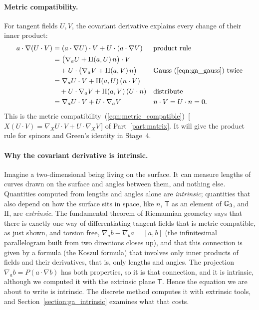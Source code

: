 \paragraph{Metric compatibility.} For tangent fields $U, V$, the covariant derivative explains every change of their inner product:
\begin{align*}
a\cdot\nabla(U\cdot V) &= (a\cdot\nabla U)\cdot V + U\cdot(a\cdot\nabla V) && \text{product rule} \\
&= \big(\nabla_a U + \mathrm{II}(a, U)\,n\big)\cdot V \\
&\quad + U\cdot\big(\nabla_a V + \mathrm{II}(a, V)\,n\big) && \text{Gauss~(\ref{eqn:ga_gauss}) twice} \\
&= \nabla_a U\cdot V + \mathrm{II}(a, U)\,(n\cdot V) \\
&\quad + U\cdot\nabla_a V + \mathrm{II}(a, V)\,(U\cdot n) && \text{distribute} \\
&= \nabla_a U\cdot V + U\cdot\nabla_a V && n\cdot V = U\cdot n = 0 .
\end{align*}
This is the metric compatibility~(\ref{eqn:metric_compatible})~[\,$X(U\cdot V) = \nabla_X U\cdot V + U\cdot\nabla_X V$\,] of Part~\ref{part:matrix}. It will give the product rule for spinors and Green's identity in Stage~4.

\paragraph{Why the covariant derivative is intrinsic.} Imagine a two-dimensional being living on the surface. It can measure lengths of curves drawn on the surface and angles between them, and nothing else. Quantities computed from lengths and angles alone are \emph{intrinsic}; quantities that also depend on how the surface sits in space, like $n$, $\mathsf T$ as an element of $\mathbb{G}_3$, and $\mathrm{II}$, are \emph{extrinsic}. The fundamental theorem of Riemannian geometry \cite{doCarmo1976} says that there is exactly one way of differentiating tangent fields that is metric compatible, as just shown, and torsion free, $\nabla_a b - \nabla_b a = [a, b]$ (the infinitesimal parallelogram built from two directions closes up), and that this connection is given by a formula (the Koszul formula) that involves only inner products of fields and their derivatives, that is, only lengths and angles. The projection $\nabla_a b = P(a \cdot \nabla b)$ has both properties, so it is that connection, and it is intrinsic, although we computed it with the extrinsic plane $\mathsf T$. Hence the equation we are about to write is intrinsic. The discrete method computes it with extrinsic tools, and Section~\ref{section:ga_intrinsic} examines what that costs.

